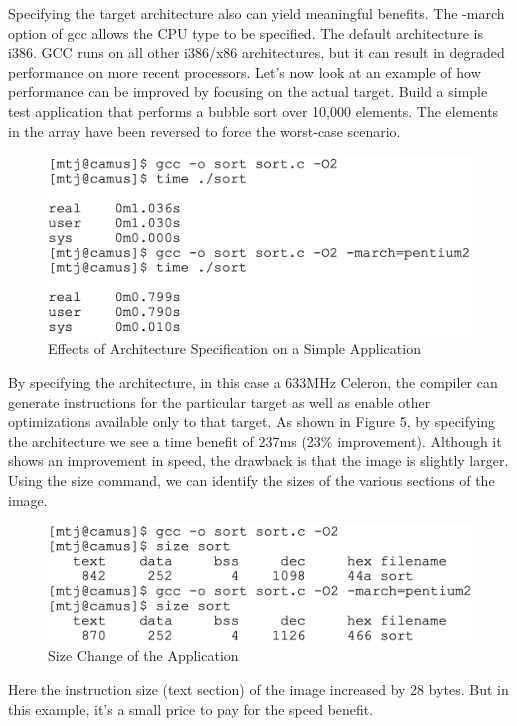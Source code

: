 \documentclass[conference]{IEEEtran}
\begin{document}
Specifying the target architecture also can yield meaningful benefits. The -march option of gcc allows the CPU type to be specified. The default architecture is i386. GCC runs on all other i386/x86 architectures, but it can result in degraded performance on more recent processors. Let's now look at an example of how performance can be improved by focusing on the actual target. Build a simple test application that performs a bubble sort over 10,000 elements. The elements in the array have been reversed to force the worst-case scenario.\cite{b4}

\begin{figure}[htbp]
\centering
\includegraphics [width=0.85\linewidth]{pictures/GCCarchi.png}
\caption{Effects of Architecture Specification on a Simple Application\cite{b4}}
\label{fig5}
\end{figure}

By specifying the architecture, in this case a 633MHz Celeron, the compiler can generate instructions for the particular target as well as enable other optimizations available only to that target. As shown in Figure 5, by specifying the architecture we see a time benefit of 237ms (23\% improvement). Although it shows an improvement in speed, the drawback is that the image is slightly larger. Using the size command, we can identify the sizes of the various sections of the image.\cite{b4}

\begin{figure}[htbp]
\centering
\includegraphics [width=0.85\linewidth]{pictures/GCCsize.png}
\caption{Size Change of the Application\cite{b4}}
\label{fig6}
\end{figure}

Here the instruction size (text section) of the image increased by 28 bytes. But in this example, it's a small price to pay for the speed benefit.\cite{b4}
\end{document}
